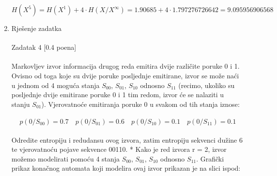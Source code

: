 \documentclass[12pt]{article}
\begin{document}
\begin{enumerate}
\begin{equation*}
    H(X^5) = H(X^1) + 4 \cdot H(X/X^\infty)  = 1.90685 + 4 \cdot 1.797276726642 = 9.095956906568
\end{equation*}
		\item Rješenje zadatka \\
		\\
Zadatak 4 [0.4 poena] \\
\\
Markovljev izvor informacija drugog reda emitira dvije različite poruke 0 i 1. Ovisno od toga koje su dvije poruke posljednje emitirane, izvor se može naći u jednom od 4 moguća stanja $S_{00}$, $S_{01}$, $S_{10}$ odnosno $S_{11}$ (recimo, ukoliko su posljednje dvije emitirane poruke 0 i 1 tim redom, izvor će se nalaziti u stanju $S_{01}$). Vjerovatnoće emitiranja poruke 0 u svakom od tih stanja iznose: \\
\\
\begin{equation*}
    p(0/S_{00}) = 0.7 \quad p(0/S_{01}) = 0.6 \quad p(0/S_{10}) = 0.1 \quad p(0/S_{11}) = 0.1 
\end{equation*}
\\
Odredite entropiju i redudansu ovog izvora, zatim entropiju sekvenci dužine 6 te vjerovatnoću pojave sekvence 00110.
		\newpage
		* Kako je red izvora r = 2, izvor možemo modelirati pomoću 4 stanja $S_{00}$,
$S_{01}$, $S_{10}$ odnosno $S_{11}$. Grafički prikaz konačnog automata koji modelira ovaj
izvor prikazan je na slici ispod: \\
\\
\end{enumerate}
\end{document}
